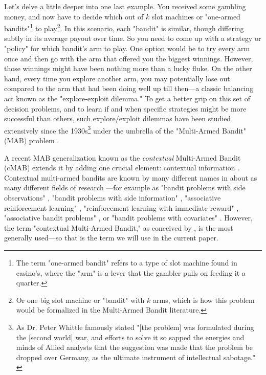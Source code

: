 \documentclass{jss}\usepackage[]{graphicx}\usepackage[]{color}
\begin{document}
Let's delve a little deeper into one last example. You received some gambling money, and now have to decide which out of $k$ slot machines or "one-armed bandits"\footnote{The term "one-armed bandit" refers to a type of slot machine found in casino's, where the "arm" is a lever that the gambler pulls on feeding it a quarter.} to play\footnote{Or one big slot machine or "bandit" with $k$ arms, which is how this problem would be formalized in the Multi-Armed Bandit literature.}. In this scenario, each "bandit" is similar, though differing subtly in its average payout over time. So you need to come up with a strategy or "policy" for which bandit's arm to play. One option would be to try every arm once and then go with the arm that offered you the biggest winnings. However, those winnings might have been nothing more than a lucky fluke. On the other hand, every time you explore another arm, you may potentially lose out compared to the arm that had been doing well up till then---a classic balancing act known as the "explore-exploit dilemma." To get a better grip on this set of decision problems, and to learn if and when specific strategies might be more successful than others, such explore/exploit dilemmas have been studied extensively since the 1930s\footnote{As Dr. Peter Whittle famously stated "[the problem] was formulated during the [second world] war, and efforts to solve it so sapped the energies and minds of Allied analysts that the suggestion was made that the problem be dropped over Germany, as the ultimate instrument of intellectual sabotage." \citep{Whittle1979}} under the umbrella of the "Multi-Armed Bandit" (MAB) problem \citep{Bubeck2012}.

A recent MAB generalization known as the \textit{contextual} Multi-Armed Bandit (cMAB) extends it by adding one crucial element: contextual information \citep{Langford2008}. Contextual multi-armed bandits are known by many different names in about as many different fields of research \citep{Tewari2017}---for example as "bandit problems with side observations" \citep{Wang2005a}, "bandit problems with side information" \citep{Lu2010}, "associative reinforcement learning" \citep{Kaelbling1996}, "reinforcement learning with immediate reward" \citep{Abe2003}, "associative bandit problems" \citep{Strehl2006}, or "bandit problems with covariates" \citep{Sarkar1991}. However, the term "contextual Multi-Armed Bandit," as conceived by \cite{Langford2008}, is the most generally used---so that is the term we will use in the current paper.
\end{document}
